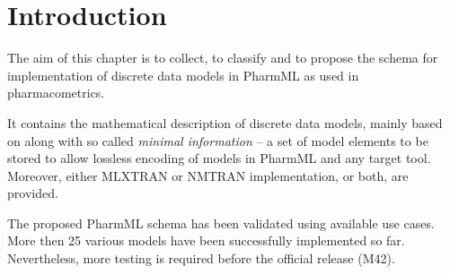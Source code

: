 \section{Introduction}
\label{sec:intro_discreteModels}


The aim of this chapter is to collect, to classify and to propose the schema for 
implementation of discrete data models in PharmML as used in pharmacometrics.

It contains the mathematical description of discrete data models, mainly based 
on \cite{LavielleBook:2014} along with so called \emph{minimal information} -- a set of model elements to be 
stored to allow lossless encoding of models in PharmML and any target tool. 
Moreover, either MLXTRAN or NMTRAN implementation, or both, are provided. 

The proposed PharmML schema has been validated using available use cases. 
More then 25 various models have been successfully implemented so far. Nevertheless,
more testing is required before the official release (M42).

